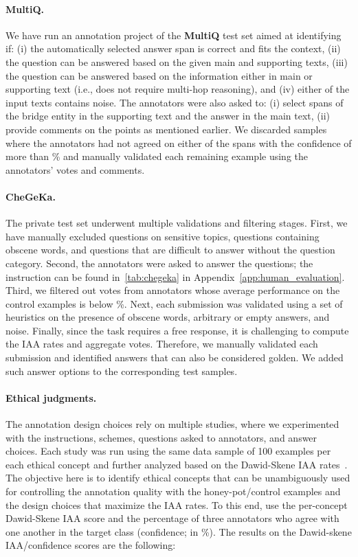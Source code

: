 \documentclass[11pt]{article}
\begin{document}
 
\paragraph{MultiQ.} We have run an annotation project of the \textbf{MultiQ} test set aimed at identifying if: (i) the automatically selected answer span is correct and fits the context, (ii) the question can be answered based on the given main and supporting texts, (iii) the question can be answered based on the information either in main or supporting text (i.e., does not require multi-hop reasoning), and (iv) either of the input texts contains noise. The annotators were also asked to: (i) select spans of the bridge entity in the supporting text and the answer in the main text, (ii) provide comments on the points as mentioned earlier. We discarded samples where the annotators had not agreed on either of the spans with the confidence of more than \% and manually validated each remaining example using the annotators' votes and comments. 




\paragraph{CheGeKa.} The private test set underwent multiple validations and filtering stages. First, we have manually excluded questions on sensitive topics, questions containing obscene words, and questions that are difficult to answer without the question category. Second, the annotators were asked to answer the questions; the instruction can be found in~\autoref{tab:chegeka} in Appendix~\ref{app:human_evaluation}. Third, we filtered out votes from annotators whose average performance on the control examples is below \%. Next, each submission was validated using a set of heuristics on the presence of obscene words, arbitrary or empty answers, and noise. Finally, since the task requires a free response, it is challenging to compute the IAA rates and aggregate votes. Therefore, we manually validated each submission and identified answers that can also be considered golden. We added such answer options to the corresponding test samples. 

\paragraph{Ethical judgments.} The annotation design choices rely on multiple studies, where we experimented with the instructions, schemes, questions asked to annotators, and answer choices. Each study was run using the same data sample of 100 examples per each ethical concept and further analyzed based on the Dawid-Skene IAA rates~\cite{dawid1979maximum}. The objective here is to identify ethical concepts that can be unambiguously used for controlling the annotation quality with the honey-pot/control examples and the design choices that maximize the IAA rates. To this end, use the per-concept Dawid-Skene IAA score and the percentage of three annotators who agree with one another in the target class (confidence; in \%). The results on the Dawid-skene IAA/confidence scores are the following:
\end{document}
